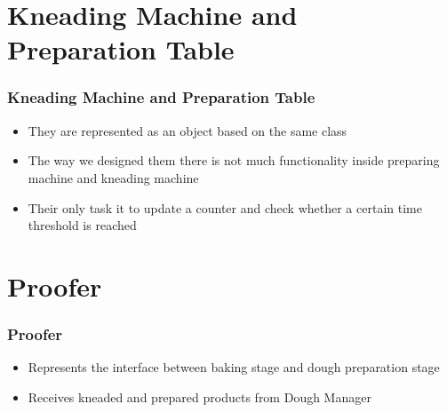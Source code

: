 \documentclass[11pt]{beamer}
\begin{document}
\section{Kneading Machine and Preparation Table}
\begin{frame}
\frametitle{Kneading Machine and Preparation Table}
\begin{itemize}
	\item They are represented as an object based on the same class
	\item The way we designed them there is not much functionality inside preparing machine and kneading machine
	\item Their only task it to update a counter and check whether a certain time threshold is reached
\end{itemize}
\end{frame}

\section{Proofer}
\begin{frame}
\frametitle{Proofer}
	\begin{itemize}
	\item Represents the interface between baking stage and dough preparation stage
	\item Receives kneaded and prepared products from Dough Manager
\end{itemize}
\end{frame}
\end{document}
